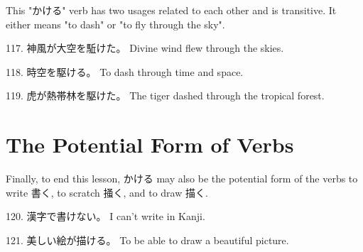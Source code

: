 \par{ This "かける" verb has two usages related to each other and is transitive. It either means "to dash" or "to fly through the sky". }

\par{117. 神風が大空を駈けた。 \hfill\break
Divine wind flew through the skies. }

\par{118. 時空を駆ける。 \hfill\break
To dash through time and space. }

\par{119. 虎が熱帯林を駆けた。 \hfill\break
The tiger dashed through the tropical forest. }
      
\section{The Potential Form of Verbs}
 
\par{ Finally, to end this lesson, かける may also be the potential form of the verbs to write 書く, to scratch 掻く, and to draw 描く. }

\par{120. 漢字で書けない。 \hfill\break
I can't write in Kanji. }

\par{121. 美しい絵が描ける。 \hfill\break
To be able to draw a beautiful picture. }
    